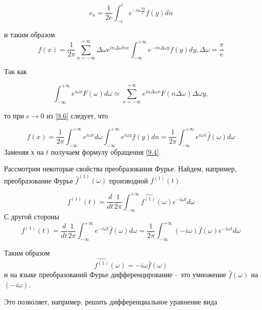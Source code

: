 \begin{equation}\label{9.15}
c_n = \frac{1}{2e} \int_{-e}^{e} e^{-i n \frac{\pi y}{e}} f(y) dn
\end{equation}
	
и таким образом 
\begin{equation}\label{9.16}
f(x) = \frac{1}{2\pi}\sum_{n = -\infty}^{+\infty} \Delta\omega e^{in\Delta\omega ln x} \int_{-\infty}^{+\infty} e^{-in\Delta\omega y} f(y) dy , \Delta\omega=\frac{\pi}{e}	
\end{equation}

Так как

\begin{equation}\label{9.17}
\int_{-\infty}^{+\infty} e^{i\omega x} F(\omega)d\omega \simeq	\sum_{n = -\infty}^{+\infty} e^{in\Delta\omega x} F(n\Delta\omega)\Delta\omega y,
\end{equation}	

то при $e \rightarrow 0$ из \ref{9.6} следует, что 

\begin{equation}
f(x) = \frac{1}{2\pi}\int_{-\infty}^{+\infty} e^{i\omega x}d\omega \int_{-\infty}^{+\infty} e^{i\omega y}f(y)dn = \frac{1}{2\pi}\int_{-\infty}^{+\infty}e^{i\omega x} \hat{f}(\omega)d\omega
\end{equation}
Заменяя $х$ на $t$ получаем формулу обращения \ref{9.4}.

Рассмотрим некоторые свойства преобразования Фурье. Найдем, например, преобразование Фурье $\hat f^{(1)} (\omega)$ производной $f^{(1)}(t)$

\begin{equation}\label{9.19}
f^{(1)}(t) = \frac{d}{dt} \frac{1}{2\pi} \int_{-\infty}^{+\infty} \hat{f^{(1)}}(\omega) e^{-i\omega t}d\omega
\end{equation}
С другой стороны 
\begin{equation}\label{9.20}
f^{(1)}(t) = \frac{d}{dt} \frac{1}{2\pi} \int_{-\infty}^{+\infty} e^{-i\omega t} \hat{f}(\omega)d\omega = \frac{1}{2\pi} \int_{-\infty}^{+\infty}(-i\omega)\hat{f}(\omega) e^{-i\omega t}d\omega
\end{equation}

Таким образом
\begin{equation}\label{9.21}
\hat{f^{(1)}}(\omega) = -i\omega \hat{f}(\omega)
\end{equation}
и на языке преобразований Фурье дифференцирование -- это умножение $\hat{f}(\omega)$ на $(-i\omega)$.

Это позволяет, например, решить дифференциальное уравнение вида

